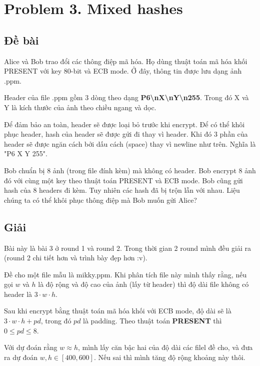 \section*{Problem 3. Mixed hashes}

\subsection*{Đề bài}

Alice và Bob trao đổi các thông điệp mã hóa. Họ dùng thuật toán mã hóa khối PRESENT với key 80-bit và ECB mode. Ở đây, thông tin được lưu dạng ảnh .ppm.

Header của file .ppm gồm 3 dòng theo dạng \textbf{P6\textbackslash nX\textbackslash nY\textbackslash n255}. Trong đó X và Y là kích thước của ảnh theo chiều ngang và dọc.

Để đảm bảo an toàn, header sẽ được loại bỏ trước khi encrypt. Để có thể khôi phục header, hash của header sẽ được gửi đi thay vì header. Khi đó 3 phần của header sẽ được ngăn cách bởi dấu cách (space) thay vì newline như trên. Nghĩa là "P6 X Y 255".

Bob chuẩn bị 8 ảnh (trong file đính kèm) mà không có header. Bob encrypt 8 ảnh đó với cùng một key theo thuật toán PRESENT và ECB mode. Bob cũng gửi hash của 8 headers đi kèm. Tuy nhiên các hash đã bị trộn lẫn với nhau. Liệu chúng ta có thể khôi phục thông điệp mà Bob muốn gửi Alice?

\subsection*{Giải}

Bài này là bài 3 ở round 1 và round 2. Trong thời gian 2 round mình đều giải ra (round 2 chi tiết hơn và trình bày đẹp hơn :v).

Đề cho một file mẫu là mikky.ppm. Khi phân tích file này mình thấy rằng, nếu gọi $w$ và $h$ là độ rộng và độ cao của ảnh (lấy từ header) thì độ dài file không có header là $3 \cdot w \cdot h$.

Sau khi encrypt bằng thuật toán mã hóa khối với ECB mode, độ dài sẽ là $3 \cdot w \cdot h + pd$, trong đó $pd$ là padding. Theo thuật toán \textbf{PRESENT} thì $0 \leqslant pd \leqslant 8$.

Với dự đoán rằng $w \approx h$, mình lấy căn bậc hai của độ dài các filel đề cho, và đưa ra dự đoán $w, h \in [400, 600]$. Nếu sai thì mình tăng độ rộng khoảng này thôi.

